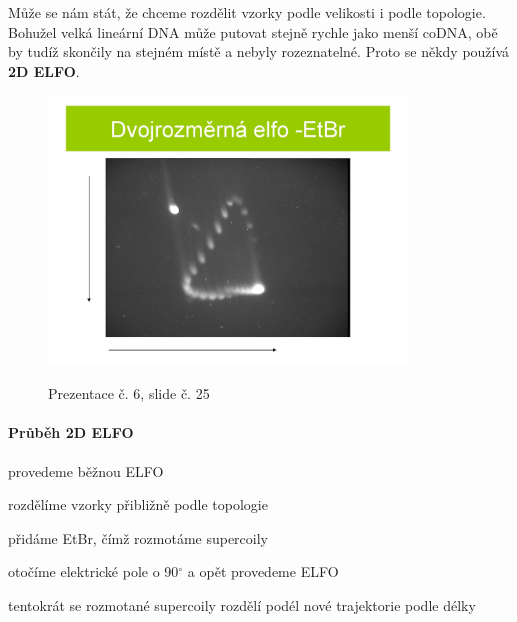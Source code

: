 \documentclass[DIV=8]{scrreprt}
\begin{document}
Může se nám stát, že chceme rozdělit vzorky podle velikosti i podle topologie. Bohužel velká lineární DNA může putovat stejně rychle jako menší coDNA, obě by tudíž skončily na stejném místě a nebyly rozeznatelné. Proto se někdy používá \textbf{2D ELFO}.

\begin{figure}
    \caption{Prezentace č. 6, slide č. 25}
    \includegraphics[width=0.85\textwidth]{slides-6/slide-25.jpg}
    \centering
    \label{slides-6-slide-25}
\end{figure}

\paragraph{Průběh 2D ELFO}
\begin{myEnumerate}[nosep]
    \item provedeme běžnou ELFO
\begin{myItemize}[nosep]
    \item rozdělíme vzorky přibližně podle topologie
\end{myItemize}

    \item přidáme EtBr, čímž rozmotáme supercoily
    \item otočíme elektrické pole o 90\(^{\circ}\) a opět provedeme ELFO
\begin{myItemize}[nosep]
    \item tentokrát se rozmotané supercoily rozdělí podél nové trajektorie podle délky
\end{myItemize}

\end{myEnumerate}
\end{document}
